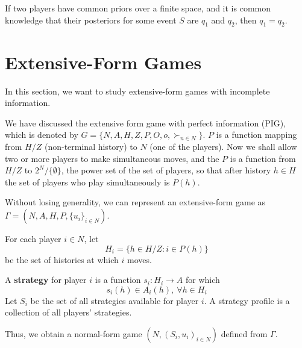 \documentclass[11pt]{elegantbook}
\begin{document}
\begin{corollary}
    If two players have common priors over a finite space, and it is common knowledge that their posteriors for some event $S$ are $q_1$ and $q_2$, then $q_1 = q_2$.
\end{corollary}


\section{Extensive-Form Games}
In this section, we want to study extensive-form games with incomplete information.

We have discussed the extensive form game with perfect information (PIG), which is denoted by $G=\{N,A,H,Z,P,O,o,\succ_{n\in N}\}$. $P$ is a function mapping from $H/Z$ (non-terminal history) to $N$ (one of the players). Now we shall allow two or more players to make simultaneous moves, and the $P$ is a function from $H/Z$ to $2^N/\{\emptyset\}$, the power set of the set of players, so that after history $h \in H$ the set of players who play simultaneously is $P(h)$.

Without losing generality, we can represent an extensive-form game as $\Gamma=\left(N,A,H,P,\{u_i\}_{i\in N}\right)$.

For each player $i \in N$, let $$H_i=\{h\in H/Z:i\in P(h)\}$$ be the set of histories at which $i$ moves.

A \textbf{strategy} for player $i$ is a function $s_i : H_i \rightarrow A$ for which $$s_i(h)\in A_i(h),\ \forall h\in H_i$$
Let $S_i$ be the set of all strategies available for player $i$. A strategy profile is a collection of all players' strategies.

Thus, we obtain a normal-form game $(N,(S_i, u_i)_{i\in N})$ defined from $\Gamma$.
\end{document}
